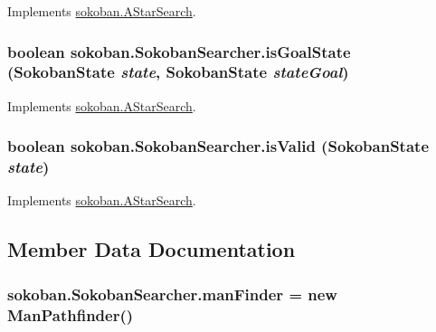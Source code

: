 Implements \hyperlink{classsokoban_1_1AStarSearch_76eb557a34fba75c6b7a5708288cbbe2}{sokoban.AStarSearch}.\hypertarget{classsokoban_1_1SokobanSearcher_e71f7570b3b8f44fae9c5999ef1cb585}{
\subsubsection[{isGoalState}]{\setlength{\rightskip}{0pt plus 5cm}boolean sokoban.SokobanSearcher.isGoalState ({\bf SokobanState} {\em state}, \/  {\bf SokobanState} {\em stateGoal})}}
\label{classsokoban_1_1SokobanSearcher_e71f7570b3b8f44fae9c5999ef1cb585}




Implements \hyperlink{classsokoban_1_1AStarSearch_8ac8ea41b08c5f3ba2c41e0b0e53c73f}{sokoban.AStarSearch}.\hypertarget{classsokoban_1_1SokobanSearcher_e5825be60850700a399b70cab9549ab3}{
\subsubsection[{isValid}]{\setlength{\rightskip}{0pt plus 5cm}boolean sokoban.SokobanSearcher.isValid ({\bf SokobanState} {\em state})}}
\label{classsokoban_1_1SokobanSearcher_e5825be60850700a399b70cab9549ab3}




Implements \hyperlink{classsokoban_1_1AStarSearch_d41e3201335321840a0d8bac8a66f86f}{sokoban.AStarSearch}.

\subsection{Member Data Documentation}
\hypertarget{classsokoban_1_1SokobanSearcher_9c7a40209ca21c1a14ca780c90859571}{
\subsubsection[{manFinder}]{ {\bf sokoban.SokobanSearcher.manFinder} = new {\bf ManPathfinder}()}}
\label{classsokoban_1_1SokobanSearcher_9c7a40209ca21c1a14ca780c90859571}


